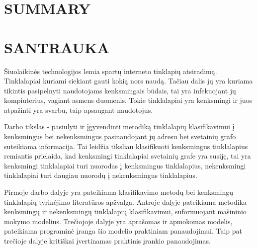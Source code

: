\documentclass[12pt, a4paper, onecolumn, titlepage, oneside, intlimits]{report}
\begin{document}
\ktuinit{}    

\newpage

\chapter[Summary]{\MakeUppercase{Summary}}\label{sec:Summary}
\chapter[Santrauka]{\MakeUppercase{Santrauka}}\label{sec:Santrauka}

\newpage


Šiuolaikinės technologijos lemia spartų interneto tinklapių atsiradimą. Tinklalapiai kuriami siekiant gauti kokią nors naudą. Tačiau dalis jų yra kuriama tikintis pasipelnyti naudotojams kenksmingais būdais, tai yra infekuojant jų kompiuterius, vagiant asmens duomenis. Tokie tinklalapiai yra kenksmingi ir juos atpažinti yra svarbu, taip apsaugant naudotojus.

Darbo tikslas - pasiūlyti ir įgyvendinti metodiką tinklalapių klasifikavimui į kenksmingus bei nekenksmingus pasinaudojant jų adresu bei svetainių grafo suteikiama informacija. Tai leidžia tiksliau klasifikuoti kenksmingus tinklalapius remiantis prielaida, kad kenksmingi tinklalapiai svetainių grafe yra susiję, tai yra kenksmingi tinklalapiai turi nuorodas į kenksmingus tinklalapius, nekenksmingi tinklalapiai turi daugiau nuorodų į nekenksmingus tinklalapius.

Pirmoje darbo dalyje yra pateikiama klasifikavimo metodų bei kenksmingų tinklalapių tyrinėjimo literatūros apžvalga. Antroje dalyje pateikiama metodika kenksmingų ir nekenksmingų tinklalapių klasifikavimui, suformuojant mašininio mokymo modelius. Trečiojoje dalyje yra aprašomas ir apmokomas modelis, pateikiama programinė įranga šio modelio praktiniam panaudojimui. Taip pat trečioje dalyje kritiškai įvertinamas praktinis įrankio panaudojimas.

\newpage










\newpage




\newpage
\end{document}
